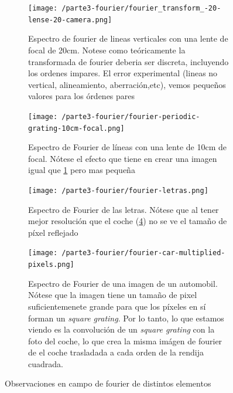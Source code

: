\documentclass{./packages/optica-article}
\begin{document}
\begin{figure}[hptb]
\begin{center}
    \begin{subfigure}[t]{0.45\textwidth}\centering
        \texttt{[image: /parte3-fourier/fourier\_transform\_-20-lense-20-camera.png]}
    \caption{Espectro de fourier de lineas verticales  con una lente de focal de 20cm. Notese como teóricamente la transformada de fourier deberia ser discreta, incluyendo los ordenes impares. El error experimental (lineas no vertical, alineamiento, aberración,etc), vemos pequeños valores para los órdenes pares}
    \label{fig:fourier1}
    \end{subfigure}
	\quad
		\begin{subfigure}[t]{0.45\textwidth}\centering
		\texttt{[image: /parte3-fourier/fourier-periodic-grating-10cm-focal.png]}
    \caption{Espectro de Fourier de líneas con una lente de 10cm de focal. Nótese el efecto que tiene en crear una imagen igual que \ref{fig:fourier1} pero mas pequeña}
    \label{fourier4}
	\end{subfigure}

	\begin{subfigure}[t]{0.45\textwidth}\centering
		\texttt{[image: /parte3-fourier/fourier-letras.png]}
    \caption{Espectro de Fourier de las letras. Nótese que al tener mejor resolución que el coche (\ref{fig:fourier2}) no se ve el tamaño de píxel reflejado}
    \label{fourier3}
	\end{subfigure}
	\quad
	\begin{subfigure}[t]{0.45\textwidth}\centering
		\texttt{[image: /parte3-fourier/fourier-car-multiplied-pixels.png]}
    \caption{Espectro de Fourier de una imagen de un automobil. Nótese que la imagen tiene un tamaño de pixel suficientemenete grande para que los píxeles en sí forman un \emph{square grating}. Por lo tanto, lo que estamos viendo es la convolución de un \emph{square grating} con la foto del coche, lo que crea la misma imágen de fourier de el coche trasladada a cada orden de la rendija cuadrada.}
    \label{fig:fourier2}
	\end{subfigure}	
	\caption{Observaciones en campo de fourier de distintos elementos}\label{fig:alltalbot}
\end{center}
\end{figure}
\end{document}
